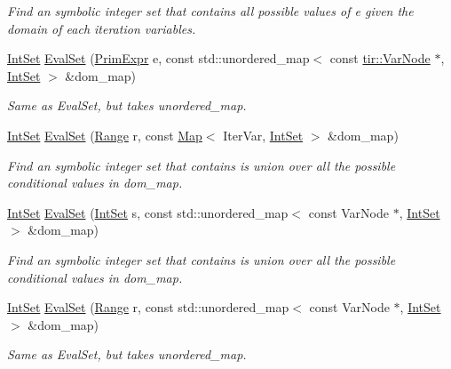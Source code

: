 \begin{DoxyCompactItemize}
\begin{DoxyCompactList}\small\item\em Find an symbolic integer set that contains all possible values of e given the domain of each iteration variables. \end{DoxyCompactList}\item 
\hyperlink{classtvm_1_1arith_1_1IntSet}{Int\+Set} \hyperlink{namespacetvm_1_1arith_a9d0d0f69e5f98e935d2bd4058d74bcfa}{Eval\+Set} (\hyperlink{classtvm_1_1PrimExpr}{Prim\+Expr} e, const std\+::unordered\+\_\+map$<$ const \hyperlink{classtvm_1_1tir_1_1VarNode}{tir\+::\+Var\+Node} $\ast$, \hyperlink{classtvm_1_1arith_1_1IntSet}{Int\+Set} $>$ \&dom\+\_\+map)
\begin{DoxyCompactList}\small\item\em Same as Eval\+Set, but takes unordered\+\_\+map. \end{DoxyCompactList}\item 
\hyperlink{classtvm_1_1arith_1_1IntSet}{Int\+Set} \hyperlink{namespacetvm_1_1arith_a74234ce6f7733b3d8055d781cc782df7}{Eval\+Set} (\hyperlink{classtvm_1_1Range}{Range} r, const \hyperlink{classtvm_1_1Map}{Map}$<$ Iter\+Var, \hyperlink{classtvm_1_1arith_1_1IntSet}{Int\+Set} $>$ \&dom\+\_\+map)
\begin{DoxyCompactList}\small\item\em Find an symbolic integer set that contains is union over all the possible conditional values in dom\+\_\+map. \end{DoxyCompactList}\item 
\hyperlink{classtvm_1_1arith_1_1IntSet}{Int\+Set} \hyperlink{namespacetvm_1_1arith_aa30b03ba03ff9cad2cad7320194dfcbe}{Eval\+Set} (\hyperlink{classtvm_1_1arith_1_1IntSet}{Int\+Set} s, const std\+::unordered\+\_\+map$<$ const Var\+Node $\ast$, \hyperlink{classtvm_1_1arith_1_1IntSet}{Int\+Set} $>$ \&dom\+\_\+map)
\begin{DoxyCompactList}\small\item\em Find an symbolic integer set that contains is union over all the possible conditional values in dom\+\_\+map. \end{DoxyCompactList}\item 
\hyperlink{classtvm_1_1arith_1_1IntSet}{Int\+Set} \hyperlink{namespacetvm_1_1arith_a4bf945fe43afafbedffad6d5633efad7}{Eval\+Set} (\hyperlink{classtvm_1_1Range}{Range} r, const std\+::unordered\+\_\+map$<$ const Var\+Node $\ast$, \hyperlink{classtvm_1_1arith_1_1IntSet}{Int\+Set} $>$ \&dom\+\_\+map)
\begin{DoxyCompactList}\small\item\em Same as Eval\+Set, but takes unordered\+\_\+map. \end{DoxyCompactList}\item 

\end{DoxyCompactItemize}
